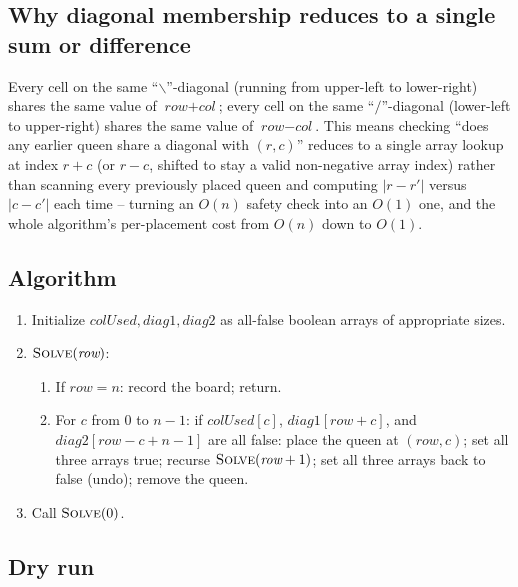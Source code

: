 \subsection*{Why diagonal membership reduces to a single sum or difference}

Every cell on the same ``$\backslash$''-diagonal (running from upper-left
to lower-right) shares the same value of $\textit{row}+\textit{col}$;
every cell on the same ``$/$''-diagonal (lower-left to upper-right)
shares the same value of $\textit{row}-\textit{col}$. This means
checking ``does any earlier queen share a diagonal with $(r,c)$'' reduces
to a single array lookup at index $r+c$ (or $r-c$, shifted to stay a
valid non-negative array index) rather than scanning every previously
placed queen and computing $|r-r'|$ versus $|c-c'|$ each time -- turning
an $O(n)$ safety check into an $O(1)$ one, and the whole algorithm's
per-placement cost from $O(n)$ down to $O(1)$.

\subsection*{Algorithm}

\begin{enumerate}
  \item Initialize $\textit{colUsed}, \textit{diag1}, \textit{diag2}$
        as all-false boolean arrays of appropriate sizes.
  \item $\textsc{Solve}(\textit{row})$:
  \begin{enumerate}
    \item If $\textit{row}=n$: record the board; return.
    \item For $c$ from $0$ to $n-1$: if $\textit{colUsed}[c]$,
          $\textit{diag1}[\textit{row}+c]$, and
          $\textit{diag2}[\textit{row}-c+n-1]$ are all false: place the
          queen at $(\textit{row},c)$; set all three arrays true;
          recurse $\textsc{Solve}(\textit{row}+1)$; set all three
          arrays back to false (undo); remove the queen.
  \end{enumerate}
  \item Call $\textsc{Solve}(0)$.
\end{enumerate}

\subsection*{Dry run}


